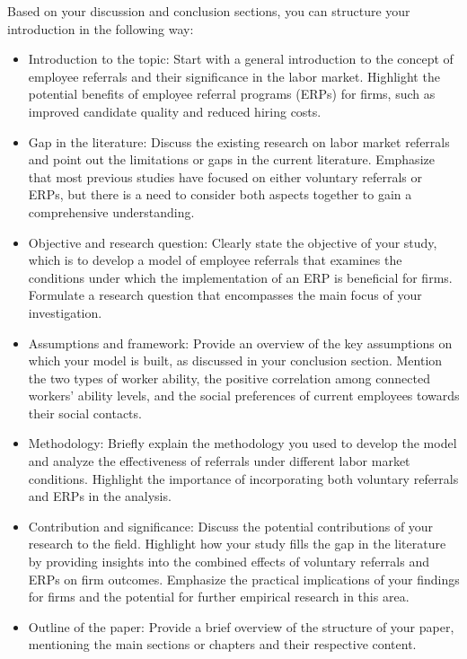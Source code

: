 \documentclass[12pt]{article}
\begin{document}
Based on your discussion and conclusion sections, you can structure your introduction in the following way:
\begin{itemize}
    \item Introduction to the topic: Start with a general introduction to the concept of employee referrals and their significance in the labor market. Highlight the potential benefits of employee referral programs (ERPs) for firms, such as improved candidate quality and reduced hiring costs.
    \item Gap in the literature: Discuss the existing research on labor market referrals and point out the limitations or gaps in the current literature. Emphasize that most previous studies have focused on either voluntary referrals or ERPs, but there is a need to consider both aspects together to gain a comprehensive understanding.
    \item Objective and research question: Clearly state the objective of your study, which is to develop a model of employee referrals that examines the conditions under which the implementation of an ERP is beneficial for firms. Formulate a research question that encompasses the main focus of your investigation.
    \item Assumptions and framework: Provide an overview of the key assumptions on which your model is built, as discussed in your conclusion section. Mention the two types of worker ability, the positive correlation among connected workers' ability levels, and the social preferences of current employees towards their social contacts.
    \item Methodology: Briefly explain the methodology you used to develop the model and analyze the effectiveness of referrals under different labor market conditions. Highlight the importance of incorporating both voluntary referrals and ERPs in the analysis.
    \item Contribution and significance: Discuss the potential contributions of your research to the field. Highlight how your study fills the gap in the literature by providing insights into the combined effects of voluntary referrals and ERPs on firm outcomes. Emphasize the practical implications of your findings for firms and the potential for further empirical research in this area.
    \item Outline of the paper: Provide a brief overview of the structure of your paper, mentioning the main sections or chapters and their respective content.
\end{itemize}
\end{document}
